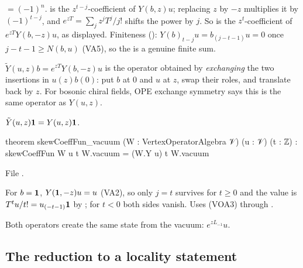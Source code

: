 \begin{dictionary}
 $=(-1)^n$.  is the $z^{t-j}$-coefficient of $Y(b,z)u$; replacing
$z$ by $-z$ multiplies it by $(-1)^{t-j}$, and $e^{zT} = \sum_jz^jT^j/j!$ shifts the power by $j$. So
 is the $z^t$-coefficient of $e^{zT}Y(b,-z)u$, as displayed. Finiteness
(): $Y(b)_{t-j}u = b_{(j-t-1)}u = 0$ once $j-t-1\ge N(b,u)$ (VA5), so the
 is a genuine finite sum.
\end{dictionary}

\begin{physics}
$\tilde Y(u,z)b = e^{zT}Y(b,-z)u$ is the operator obtained by \emph{exchanging} the two insertions in
$u(z)b(0)$: put $b$ at $0$ and $u$ at $z$, swap their roles, and translate back by $z$. For bosonic
chiral fields, OPE exchange symmetry says this is the same operator as $Y(u,z)$.
\end{physics}

\begin{lemma}\label{l03:lem:skewvac}
$\tilde Y(u,z)\mathbf{1} = Y(u,z)\mathbf{1}$.
\end{lemma}
\begin{leancode}
theorem skewCoeffFun_vacuum (W : VertexOperatorAlgebra 𝒱) (u : 𝒱) (t : ℤ) :
    skewCoeffFun W u t W.vacuum = (W.Y u) t W.vacuum
\end{leancode}
File .

\begin{dictionary}
For $b = \mathbf{1}$, $Y(\mathbf{1},-z)u = u$ (VA2), so only $j = t$ survives for $t\ge0$ and the value is
$T^tu/t! = u_{(-t-1)}\mathbf{1}$ by ; for $t<0$ both sides vanish. Uses (VOA3)
through .
\end{dictionary}

\begin{physics}
Both operators create the same state from the vacuum: $e^{zL_{-1}}u$.
\end{physics}

\subsection{The reduction to a locality statement}

